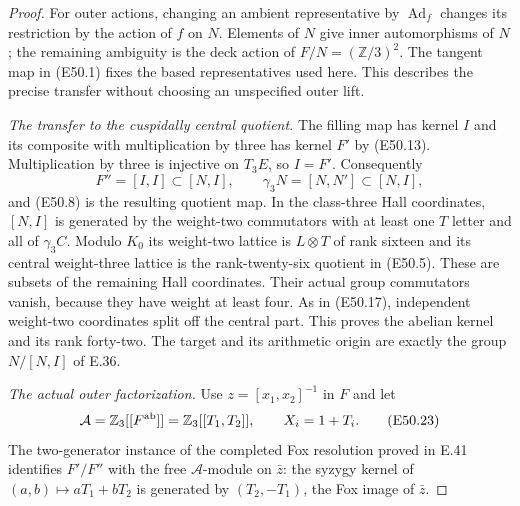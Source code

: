 \begin{proof}
For outer actions, changing an
ambient representative by
$\operatorname{Ad}_f$ changes its
restriction by the action of $f$ on
$N$. Elements of $N$ give inner
automorphisms of $N$; the remaining
ambiguity is the deck action of
$F/N=(\mathbb Z/3)^2$. The tangent
map in (E50.1) fixes the based
representatives used here. This
describes the precise transfer
without choosing an unspecified
outer lift.

\emph{The transfer to the cuspidally
central quotient.}
The filling map has kernel $I$ and
its composite with multiplication
by three has kernel $F'$ by
(E50.13). Multiplication by three
is injective on $T_3E$, so $I=F'$.
Consequently
\[
 F''=[I,I]\subset[N,I],\qquad
 \gamma_3N=[N,N']\subset[N,I],
 \tag{E50.22}
\]
and (E50.8) is the resulting
quotient map. In the class-three
Hall coordinates, $[N,I]$ is
generated by the weight-two
commutators with at least one
$T$ letter and all of
$\gamma_3C$. Modulo $K_0$ its
weight-two lattice is $L\otimes T$
of rank sixteen and its central
weight-three lattice is the
rank-twenty-six quotient in
(E50.5). These are subsets of
the remaining Hall coordinates.
Their actual group commutators
vanish, because they have weight
at least four. As in (E50.17),
independent weight-two coordinates
split off the central part. This
proves the abelian kernel and its
rank forty-two. The target and
its arithmetic origin are exactly
the group $N/[N,I]$ of E.36.

\emph{The actual outer factorization.}
Use $z=[x_1,x_2]^{-1}$ in $F$ and
let
\[
 \mathcal A=\mathbb Z_3[[F^{\rm ab}]]
      =\mathbb Z_3[[T_1,T_2]],\qquad
 X_i=1+T_i.
 \tag{E50.23}
\]
The two-generator instance of the
completed Fox resolution proved
in E.41 identifies $F'/F''$ with
the free $\mathcal A$-module on
$\bar z$: the syzygy kernel of
$(a,b)\mapsto aT_1+bT_2$ is
generated by $(T_2,-T_1)$, the
Fox image of $\bar z$.


\end{proof}
